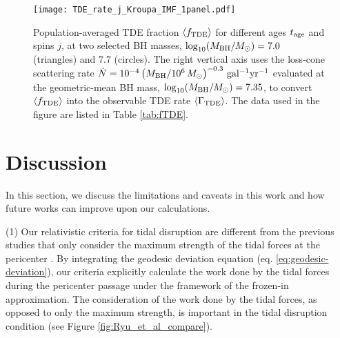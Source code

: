 \documentclass[useAMS,usenatbib]{mn2e}
\def\msun{M_{\rm \odot}}
\def\mBH{M_{\rm BH}}
\def\GammaTDE{\Gamma_{\rm TDE}}
\def\fTDE{f_{\rm TDE}}
\def\tage{t_{\rm age}}
\newcommand{\lrb}[1]{\left({#1}\right)}
\newcommand{\lara}[1]{\left\langle{#1}\right\rangle}
\begin{document}
\begin{figure}
    \centering
    \texttt{[image: TDE\_rate\_j\_Kroupa\_IMF\_1panel.pdf]}
    \caption{
    Population-averaged TDE fraction $\lara{\fTDE}$ for different ages $\tage$ and spins $j$, at two selected BH masses, $\log_{10}(\mBH/\msun)=7.0$ (triangles) and $7.7$ (circles).
    The right vertical axis uses the loss-cone scattering rate $\dot{N}=10^{-4}\lrb{\mBH/10^6\,\msun}^{-0.3}\,\rm gal^{-1}yr^{-1}$ evaluated at the geometric-mean BH mass, $\log_{10}(\mBH/\msun)=7.35$, to convert $\lara{\fTDE}$ into the observable TDE rate $\lara{\GammaTDE}$. The data used in the figure are listed in Table \ref{tab:fTDE}.
    }
    \label{fig:TDE_rate_j_Kroupa_IMF}
\end{figure}



\section{Discussion}\label{sec:discussion}


In this section, we discuss the limitations and caveats in this work and how future works can improve upon our calculations.

(1) Our relativistic criteria for tidal disruption are different from the previous studies that only consider the maximum strength of the tidal forces at the pericenter \citep{Kesden2012,Coughlin2022a,Coughlin2022b}. By integrating the geodesic deviation equation (eq. \ref{eq:geodesic-deviation}), our criteria explicitly calculate the work done by the tidal forces during the pericenter passage under the framework of the frozen-in approximation. The consideration of the work done by the tidal forces, as opposed to only the maximum strength, is important in the tidal disruption condition (see Figure \ref{fig:Ryu_et_al_compare}).
\end{document}
